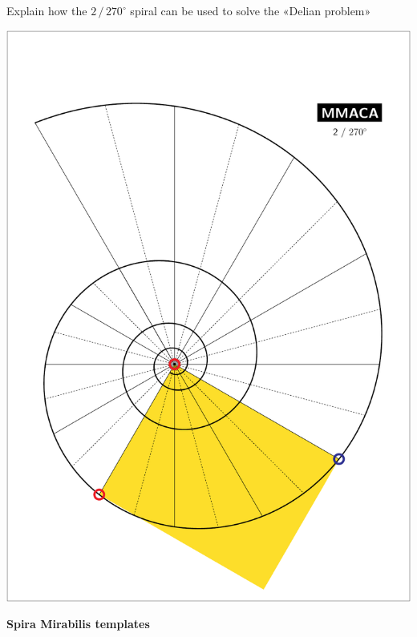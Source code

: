 \documentclass[a4paper,12pt]{article}
\begin{document}
    \begin{center}
    
        \large

        Explain how the $2 \, / \, 270^{\circ}$ spiral can be used to solve the «Delian problem»

        \bigskip \bigskip \bigskip
    
        \includegraphics[scale=0.7071]{./pictures/Example_15}

    \end{center}

    \newpage


    \phantom{.}
    \vspace{26em}

    {\huge \bf Spira Mirabilis templates}
\end{document}
